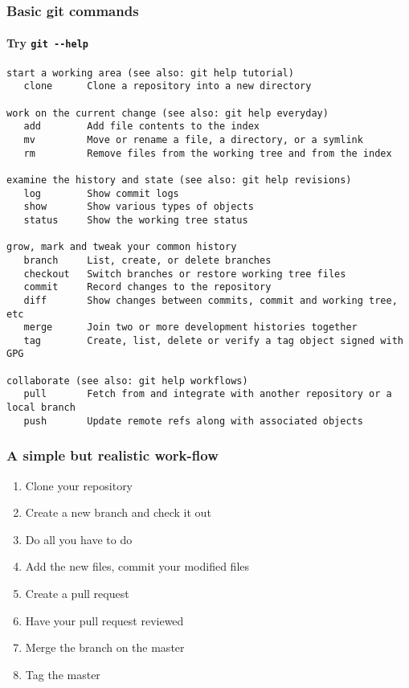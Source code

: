 \documentclass[9pt]{beamer}
\begin{document}
\begin{frame}[fragile]
  \frametitle{Basic git commands}
  \framesubtitle{Try \texttt{git -{}-help}}
  \begin{Verbatim}
start a working area (see also: git help tutorial)
   clone      Clone a repository into a new directory

work on the current change (see also: git help everyday)
   add        Add file contents to the index
   mv         Move or rename a file, a directory, or a symlink
   rm         Remove files from the working tree and from the index

examine the history and state (see also: git help revisions)
   log        Show commit logs
   show       Show various types of objects
   status     Show the working tree status

grow, mark and tweak your common history
   branch     List, create, or delete branches
   checkout   Switch branches or restore working tree files
   commit     Record changes to the repository
   diff       Show changes between commits, commit and working tree, etc
   merge      Join two or more development histories together
   tag        Create, list, delete or verify a tag object signed with GPG

collaborate (see also: git help workflows)
   pull       Fetch from and integrate with another repository or a local branch
   push       Update remote refs along with associated objects
  \end{Verbatim}
\end{frame}


\begin{frame}[fragile]
  \frametitle{A simple but realistic work-flow}
  \begin{enumerate}
  \item Clone your repository
  \item Create a new branch and check it out
  \item Do all you have to do
  \item Add the new files, commit your modified files
  \item Create a pull request
  \item Have your pull request reviewed
  \item Merge the branch on the master
  \item Tag the master
  \end{enumerate}
\end{frame}
\end{document}
